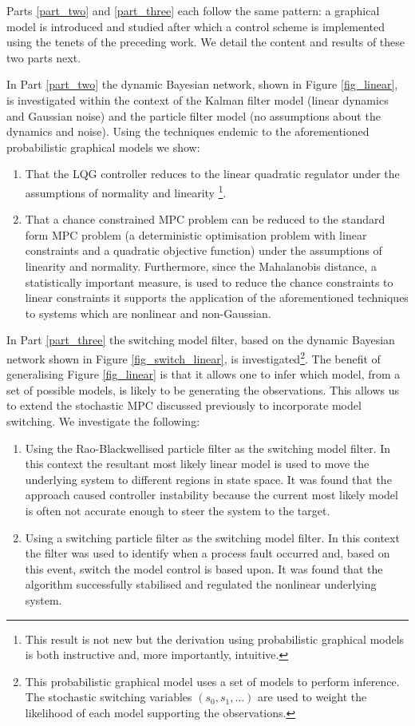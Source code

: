 Parts \ref{part_two} and \ref{part_three} each follow the same pattern: a graphical model is introduced and studied after which a control scheme is implemented using the tenets of the preceding work. We detail the content and results of these two parts next.

In Part \ref{part_two} the dynamic Bayesian network, shown in Figure \ref{fig_linear}, is investigated within the context of the Kalman filter model (linear dynamics and Gaussian noise) and the particle filter model (no assumptions about the dynamics and noise). Using the techniques endemic to the aforementioned probabilistic graphical models we show:
\begin{enumerate}
\item
That the LQG controller reduces to the linear quadratic regulator under the assumptions of normality and linearity \footnote{This result is not new but the derivation using probabilistic graphical models is both instructive and, more importantly, intuitive.}.
\item
That a chance constrained MPC problem can be reduced to the standard form MPC problem (a deterministic optimisation problem with linear constraints and a quadratic objective function) under the assumptions of linearity and normality. Furthermore, since the Mahalanobis distance, a statistically important measure, is used to reduce the chance constraints to linear constraints it supports the application of the aforementioned techniques to systems which are nonlinear and non-Gaussian. 
\end{enumerate}
In Part \ref{part_three} the switching model filter, based on the dynamic Bayesian network shown in Figure \ref{fig_switch_linear}, is investigated\footnote{This probabilistic graphical model uses a set of models to perform inference. The stochastic switching variables $(s_0, s_1,...)$ are used to weight the likelihood of each model supporting the observations.}. The benefit of generalising Figure \ref{fig_linear} is that it allows one to infer which model, from a set of possible models, is likely to be generating the observations. This allows us to extend the stochastic MPC discussed previously to incorporate model switching. We investigate the following:
\begin{enumerate}
\item
Using the Rao-Blackwellised particle filter as the switching model filter. In this context the resultant most likely linear model is used to move the underlying system to different regions in state space. It was found that the approach caused controller instability because the current most likely model is often not accurate enough to steer the system to the target.
\item
Using a switching particle filter as the switching model filter. In this context the filter was used to identify when a process fault occurred and, based on this event, switch the model control is based upon. It was found that the algorithm successfully stabilised and regulated the nonlinear underlying system.
\end{enumerate}

